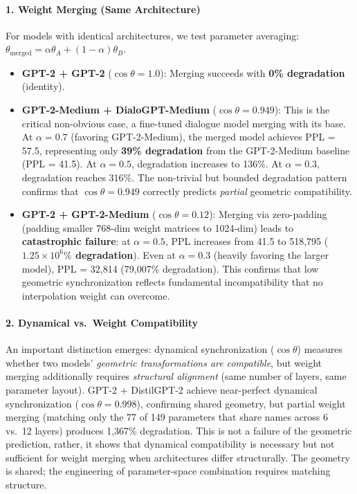 \documentclass[10pt]{article} %
\theoremstyle{plain}
\theoremstyle{definition}
\theoremstyle{remark}
\begin{document}
\paragraph{1. Weight Merging (Same Architecture)}
For models with identical architectures, we test parameter averaging: $\theta_{\text{merged}} = \alpha \theta_A + (1-\alpha) \theta_B$.
\begin{itemize}
    \item \textbf{GPT-2 + GPT-2} ($\cos \theta = 1.0$): Merging succeeds with \textbf{0\% degradation} (identity).
    \item \textbf{GPT-2-Medium + DialoGPT-Medium} ($\cos \theta = 0.949$): This is the critical non-obvious case, a fine-tuned dialogue model merging with its base. At $\alpha = 0.7$ (favoring GPT-2-Medium), the merged model achieves PPL = 57.5, representing only \textbf{39\% degradation} from the GPT-2-Medium baseline (PPL = 41.5). At $\alpha = 0.5$, degradation increases to 136\%. At $\alpha = 0.3$, degradation reaches 316\%. The non-trivial but bounded degradation pattern confirms that $\cos \theta = 0.949$ correctly predicts \textit{partial} geometric compatibility.
    \item \textbf{GPT-2 + GPT-2-Medium} ($\cos \theta = 0.12$): Merging via zero-padding (padding smaller 768-dim weight matrices to 1024-dim) leads to \textbf{catastrophic failure}: at $\alpha = 0.5$, PPL increases from 41.5 to 518,795 (\textbf{$1.25 \times 10^6\%$ degradation}). Even at $\alpha = 0.3$ (heavily favoring the larger model), PPL = 32,814 (79,007\% degradation). This confirms that low geometric synchronization reflects fundamental incompatibility that no interpolation weight can overcome.
\end{itemize}

\paragraph{2. Dynamical vs.\ Weight Compatibility}
An important distinction emerges: dynamical synchronization ($\cos \theta$) measures whether two models' \textit{geometric transformations are compatible}, but weight merging additionally requires \textit{structural alignment} (same number of layers, same parameter layout). GPT-2 + DistilGPT-2 achieve near-perfect dynamical synchronization ($\cos \theta = 0.998$), confirming shared geometry, but partial weight merging (matching only the 77 of 149 parameters that share names across 6 vs.\ 12 layers) produces 1,367\% degradation. This is not a failure of the geometric prediction, rather, it shows that dynamical compatibility is necessary but not sufficient for weight merging when architectures differ structurally. The geometry is shared; the engineering of parameter-space combination requires matching structure.
\end{document}

